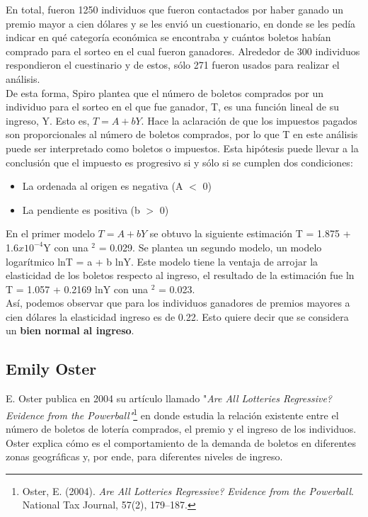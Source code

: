 En total, fueron 1250 individuos que fueron contactados por haber ganado un premio mayor a cien dólares y se les envió un cuestionario, en donde se les pedía indicar en qué categoría económica se encontraba y cuántos boletos habían comprado para el sorteo en el cual fueron ganadores. Alrededor de 300 individuos respondieron el cuestinario y de estos, sólo 271 fueron usados para realizar el análisis. \\

De esta forma, Spiro plantea que el número de boletos comprados por un individuo para el sorteo en el que fue ganador, T, es una función lineal de su ingreso, Y. Esto es, $T = A + bY$. Hace la aclaración de que los impuestos pagados son proporcionales al número de boletos comprados, por lo que T en este análisis puede ser interpretado como boletos o impuestos. Esta hipótesis puede llevar a la conclusión que el impuesto es progresivo si y sólo si se cumplen dos condiciones:

\begin{itemize}
    \item La ordenada al origen es negativa (A $<$ 0)
    \item La pendiente es positiva (b $>$ 0)
\end{itemize}

En el primer modelo $T = A + bY$ se obtuvo la siguiente estimación T = 1.875 + 1.6$x10^{-4}$Y con una $^2$ = 0.029. Se plantea un segundo modelo, un modelo logarítmico lnT = a + b lnY. Este modelo tiene la ventaja de arrojar la elasticidad de los boletos respecto al ingreso, el resultado de la estimación fue ln T = 1.057 + 0.2169 lnY con una $^2$ = 0.023. \\

Así, podemos observar que para los individuos ganadores de premios mayores a cien dólares la elasticidad ingreso es de 0.22. Esto quiere decir que se considera un \textbf{bien normal al ingreso}.

\newpage

\subsection{Emily Oster}

E. Oster publica en 2004 su artículo llamado "\textit{Are All Lotteries Regressive? Evidence from the Powerball"}\footnote{Oster, E. (2004). \textit{Are All Lotteries Regressive? Evidence from the Powerball}. National Tax Journal, 57(2), 179–187.} en donde estudia la relación existente entre el número de boletos de lotería comprados, el premio y el ingreso de los individuos. Oster explica cómo es el comportamiento de la demanda de boletos en diferentes zonas geográficas y, por ende, para diferentes niveles de ingreso. \\

